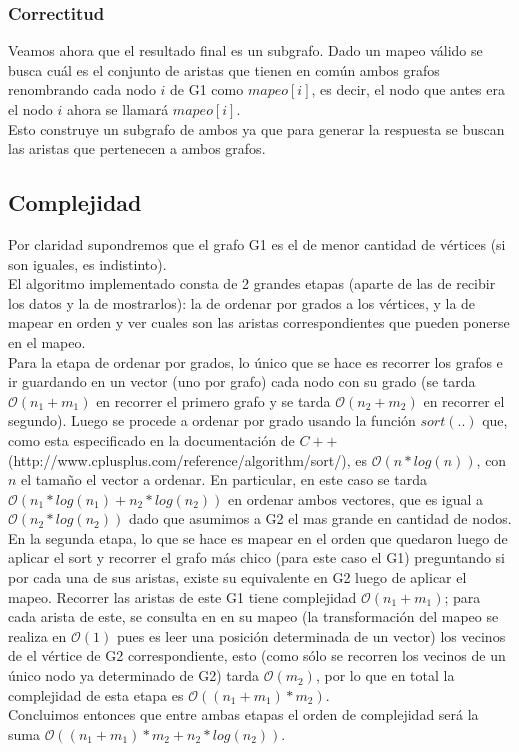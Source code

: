 \subsubsection*{Correctitud}
\noindent Veamos ahora que el resultado final es un subgrafo. Dado un mapeo válido se busca cuál es el conjunto de aristas que tienen en común ambos grafos renombrando cada nodo $i$ de G1 como $mapeo[i]$, es decir, el nodo que antes era el nodo $i$ ahora se llamará $mapeo[i]$.\\
Esto construye un subgrafo de ambos ya que para generar la respuesta se buscan las aristas que pertenecen a ambos grafos. 


\subsection{Complejidad}
Por claridad supondremos que el grafo G1 es el de menor cantidad de vértices (si son iguales, es indistinto).\\
El algoritmo implementado consta de 2 grandes etapas (aparte de las de recibir los datos y la de mostrarlos): la de ordenar por grados a los vértices, y la de mapear en orden y ver cuales son las aristas correspondientes que pueden ponerse en el mapeo.\\
Para la etapa de ordenar por grados, lo único que se hace es recorrer los grafos e ir guardando en un vector (uno por grafo) cada nodo con su grado (se tarda $\mathcal{O}(n_1+m_1)$ en recorrer el primero grafo y se tarda $\mathcal{O}(n_2+m_2)$ en recorrer el segundo). Luego se procede a ordenar por grado usando la función $sort(..)$ que, como esta especificado en la documentación de $C++$ (http://www.cplusplus.com/reference/algorithm/sort/), es $\mathcal{O}(n*log(n))$, con $n$ el tamaño el vector a ordenar. En particular, en este caso se tarda $\mathcal{O}(n_1*log(n_1)+n_2*log(n_2))$ en ordenar ambos vectores, que es igual a $\mathcal{O}(n_2*log(n_2))$ dado que asumimos a G2 el mas grande en cantidad de nodos.\\
En la segunda etapa, lo que se hace es mapear en el orden que quedaron luego de aplicar el sort y recorrer el grafo más chico (para este caso el G1) preguntando si por cada una de sus aristas, existe su equivalente en G2 luego de aplicar el mapeo. Recorrer las aristas de este G1 tiene complejidad $\mathcal{O}(n_1+m_1)$; para cada arista de este, se consulta en en su mapeo (la transformación del mapeo se realiza en $\mathcal{O}(1)$ pues es leer una posición determinada de un vector) los vecinos de el vértice de G2 correspondiente, esto (como sólo se recorren los vecinos de un único nodo ya determinado de G2) tarda $\mathcal{O}(m_2)$, por lo que en total la complejidad de esta etapa es $\mathcal{O}((n_1+m_1)*m_2)$.\\
Concluimos entonces que entre ambas etapas el orden de complejidad será la suma $\mathcal{O}((n_1+m_1)*m_2+n_2*log(n_2))$.


